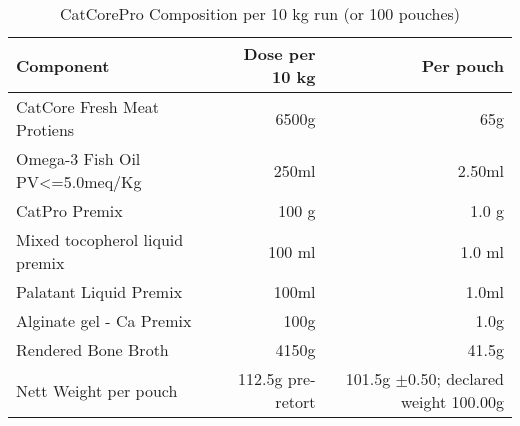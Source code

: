 \begin{table}[h]
\centering
\caption{CatCorePro Composition per 10 kg run (or 100 pouches)}
\label{tab catcorepro_composition}
\begin{tabular}{@{}l r r@{}}
\toprule
\textbf{Component} & \textbf{Dose per 10 kg} & \textbf{Per pouch} \\
\midrule
CatCore Fresh Meat Protiens & 6500g & 65g \\ [3pt]
Omega-3 Fish Oil PV<=5.0meq/Kg & 250ml & 2.50ml \\[3pt]
CatPro Premix & 100 g & 1.0 g \\[3pt]
Mixed tocopherol liquid premix & 100 ml & 1.0 ml \\[3pt]
Palatant Liquid Premix & 100ml & 1.0ml \\[3pt]
Alginate gel - Ca Premix & 100g & 1.0g \\[3pt]
\midrule
Rendered Bone Broth & 4150g & 41.5g  \\[3pt]
\midrule
Nett Weight per pouch & 112.5g pre-retort & 101.5g $\pm$0.50; declared weight 100.00g\\[3pt]
\bottomrule
\end{tabular}
\end{table}

